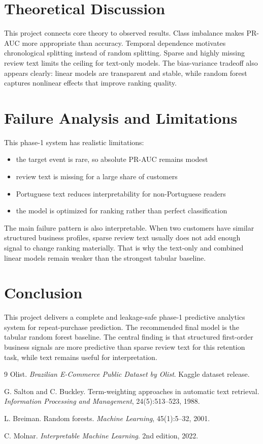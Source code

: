 \documentclass[11pt,a4paper]{article}
\begin{document}
\section{Theoretical Discussion}
This project connects core theory to observed results. Class imbalance makes PR-AUC more appropriate than accuracy. Temporal dependence motivates chronological splitting instead of random splitting. Sparse and highly missing review text limits the ceiling for text-only models. The bias-variance tradeoff also appears clearly: linear models are transparent and stable, while random forest captures nonlinear effects that improve ranking quality.

\section{Failure Analysis and Limitations}
This phase-1 system has realistic limitations:
\begin{itemize}
\item the target event is rare, so absolute PR-AUC remains modest
\item review text is missing for a large share of customers
\item Portuguese text reduces interpretability for non-Portuguese readers
\item the model is optimized for ranking rather than perfect classification
\end{itemize}

The main failure pattern is also interpretable. When two customers have similar structured business profiles, sparse review text usually does not add enough signal to change ranking materially. That is why the text-only and combined linear models remain weaker than the strongest tabular baseline.

\section{Conclusion}
This project delivers a complete and leakage-safe phase-1 predictive analytics system for repeat-purchase prediction. The recommended final model is the tabular random forest baseline. The central finding is that structured first-order business signals are more predictive than sparse review text for this retention task, while text remains useful for interpretation.

\begin{thebibliography}{9}
Olist. \emph{Brazilian E-Commerce Public Dataset by Olist}. Kaggle dataset release.

G. Salton and C. Buckley.
\newblock Term-weighting approaches in automatic text retrieval.
\newblock \emph{Information Processing and Management}, 24(5):513--523, 1988.

L. Breiman.
\newblock Random forests.
\newblock \emph{Machine Learning}, 45(1):5--32, 2001.

C. Molnar.
\newblock \emph{Interpretable Machine Learning}.
\newblock 2nd edition, 2022.
\end{thebibliography}
\end{document}
